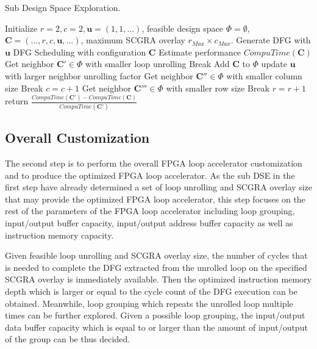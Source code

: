 \begin{algorithm}[hp]
\caption{Sub Design Space Exploration.}
\label{alg:revenuealg}
\begin{algorithmic}
\PROCEDURE{}
\STATE Initialize $r=2, c=2, \bm{u}=(1,1,...)$, feasible design space $\Phi=\emptyset$,
$\bm{C}=(...,r,c,\bm{u},...)$, maximum SCGRA overlay $r_{Max}\times c_{Max}$.
\STATE Generate DFG with $\bm{u}$
\STATE DFG Scheduling with configuration $\bm{C}$
\STATE Estimate performance $CompuTime(\bm{C})$
\STATE Get neighbor $\bm{C'} \in \Phi$ with smaller loop unrolling
\STATE Break
\ELSE 
\STATE Add $\bm{C}$ to $\Phi$
\ENDIF
\STATE update $\bm{u}$ with larger neighbor unrolling factor
\ENDWHILE
\STATE Get neighbor $\bm{C''} \in \Phi$ with smaller column size
\STATE Break
\ENDIF
\STATE $c=c+1$
\ENDWHILE
\STATE Get neighbor $\bm{C'''} \in \Phi$ with smaller row size
\STATE Break
\ENDIF
\STATE $r=r+1$
\ENDWHILE
\ENDPROCEDURE
\STATE
{}
\STATE return $\frac{CompuTime(\bm{C'})-CompuTime(\bm{C})}{CompuTime(\bm{C'})}$ 
\ENDPROCEDURE
\end{algorithmic}
\end{algorithm}

\subsection{Overall Customization}
The second step is to perform the overall FPGA loop accelerator customization and to produce the optimized FPGA loop accelerator. As the sub DSE in the first step have already determined a set of loop unrolling and SCGRA overlay size that may provide the optimized FPGA loop accelerator, this step focuses on the rest of the parameters of the FPGA loop accelerator including loop grouping, input/output buffer capacity, input/output address buffer capacity as well as instruction memory capacity. 

Given feasible loop unrolling and SCGRA overlay size, the number of cycles that is needed to complete the DFG extracted from the unrolled loop on the specified SCGRA overlay is immediately available. Then the optimized instruction memory depth which is larger or equal to the cycle count of the DFG execution can be obtained. Meanwhile, loop grouping which repeats the unrolled loop multiple times can be further explored. Given a possible loop grouping, the input/output data buffer capacity which is equal to or larger than the amount of input/output of the group can be thus decided. 

